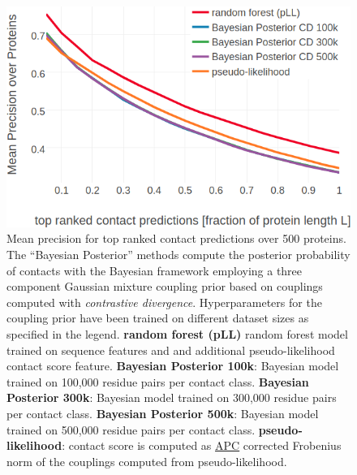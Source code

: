 \documentclass[11pt,a4paper,twoside]{book}
\theoremstyle{definition}
\theoremstyle{definition}
\theoremstyle{remark}
\begin{document}
\begin{figure}

{\centering \includegraphics[width=0.9\linewidth]{img/bayesian_model/benchmark/precision_vs_rank_cd_3comp_all_datasets} 

}

\caption{Mean precision for top
ranked contact predictions over 500 proteins. The ``Bayesian Posterior''
methods compute the posterior probability of contacts with the Bayesian
framework employing a three component Gaussian mixture coupling prior
based on couplings computed with \emph{contrastive divergence}.
Hyperparameters for the coupling prior have been trained on different
dataset sizes as specified in the legend. \textbf{random forest (pLL)}
random forest model trained on sequence features and and additional
pseudo-likelihood contact score feature. \textbf{Bayesian Posterior
100k}: Bayesian model trained on 100,000 residue pairs per contact
class. \textbf{Bayesian Posterior 300k}: Bayesian model trained on
300,000 residue pairs per contact class. \textbf{Bayesian Posterior
500k}: Bayesian model trained on 500,000 residue pairs per contact
class. \textbf{pseudo-likelihood}: contact score is computed as
\protect\hyperlink{abbrev}{APC} corrected Frobenius norm of the
couplings computed from pseudo-likelihood.}\label{fig:precision-bayesian-model-cd-3comp}
\end{figure}
\end{document}
